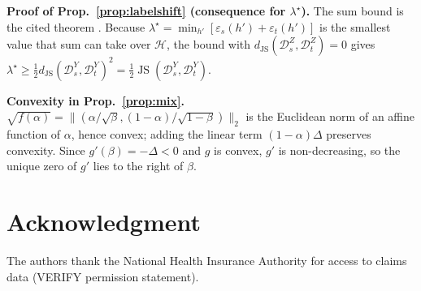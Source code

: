 \documentclass[journal]{IEEEtran}
\newcommand{\1}{\mathbf{1}}
\newcommand{\Hspace}{\mathcal{H}}
\DeclareMathOperator{\JS}{JS}
\begin{document}
\textbf{Proof of Prop.~\ref{prop:labelshift} (consequence for $\lambda^\star$).} The sum bound is the cited theorem \cite{zhao2019invariant}. Because $\lambda^\star=\min_{h'}[\varepsilon_s(h')+\varepsilon_t(h')]$ is the smallest value that sum can take over $\Hspace$, the bound with $d_{\JS}(\mathcal D_s^Z,\mathcal D_t^Z)=0$ gives $\lambda^\star\ge\tfrac12 d_{\JS}(\mathcal D_s^Y,\mathcal D_t^Y)^2=\tfrac12\JS(\mathcal D_s^Y,\mathcal D_t^Y)$.

\textbf{Convexity in Prop.~\ref{prop:mix}.} $\sqrt{f(\alpha)}=\|(\alpha/\sqrt\beta,(1-\alpha)/\sqrt{1-\beta})\|_2$ is the Euclidean norm of an affine function of $\alpha$, hence convex; adding the linear term $(1-\alpha)\Delta$ preserves convexity. Since $g'(\beta)=-\Delta<0$ and $g$ is convex, $g'$ is non-decreasing, so the unique zero of $g'$ lies to the right of $\beta$.

\section*{Acknowledgment}
The authors thank the National Health Insurance Authority for access to claims data (VERIFY permission statement).



\end{document}
